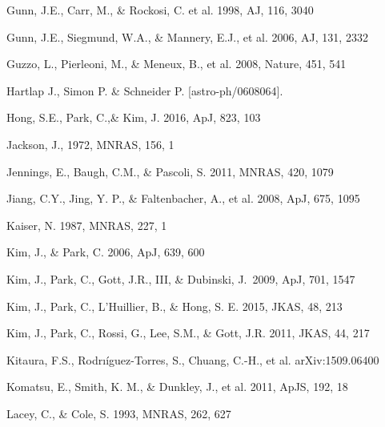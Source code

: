 \documentclass[iop]{emulateapj}
\begin{document}
\begin{thebibliography}{}


Gunn, J.E., Carr, M., \& Rockosi, C. et al. 1998, AJ, 116, 3040

Gunn, J.E., Siegmund, W.A., \& Mannery, E.J., et al. 2006, AJ, 131, 2332

Guzzo, L., Pierleoni, M., \& Meneux, B., et al. 2008, Nature, 451, 541

Hartlap J., Simon P. \& Schneider P. [astro-ph/0608064].


Hong, S.E., Park, C.,\&  Kim, J. 2016, ApJ, 823, 103

Jackson, J., 1972, MNRAS, 156, 1

Jennings, E., Baugh, C.M., \& Pascoli, S. 2011, MNRAS, 420, 1079  


Jiang, C.Y., Jing, Y. P., \& Faltenbacher, A., et al. 2008, ApJ, 675, 1095

Kaiser, N. 1987, MNRAS, 227, 1


Kim, J., \& Park, C. 2006, ApJ, 639, 600  

Kim, J., Park, C., Gott, J.R., III, \& Dubinski, J.\ 2009, ApJ, 701, 1547 

Kim, J., Park, C., L'Huillier, B., \& Hong, S. E. 2015, JKAS, 48, 213

Kim, J., Park, C., Rossi, G., Lee, S.M., \& Gott, J.R. 2011, JKAS, 44, 217  

Kitaura, F.S., Rodrı\'{i}guez-Torres, S., Chuang, C.-H., et al. arXiv:1509.06400

Komatsu, E., Smith, K. M., \& Dunkley, J., et al. 2011, ApJS, 192, 18  

Lacey, C., \& Cole, S. 1993, MNRAS, 262, 627



\end{thebibliography}
\end{document}
